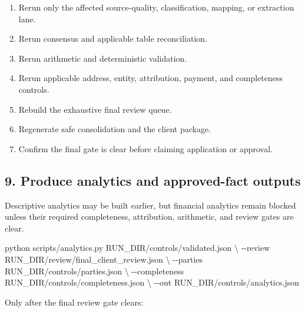\documentclass[
]{article}
\newenvironment{Shaded}{}{}
\newcommand{\AttributeTok}[1]{\textcolor[rgb]{0.49,0.56,0.16}{#1}}
\newcommand{\DataTypeTok}[1]{\textcolor[rgb]{0.56,0.13,0.00}{#1}}
\newcommand{\ExtensionTok}[1]{#1}
\newcommand{\NormalTok}[1]{#1}
\providecommand{\tightlist}{%
  \setlength{\itemsep}{0pt}\setlength{\parskip}{0pt}}
\begin{document}
\begin{enumerate}
\def\labelenumi{\arabic{enumi}.}
\tightlist
\item
  Rerun only the affected source-quality, classification, mapping, or
  extraction lane.
\item
  Rerun consensus and applicable table reconciliation.
\item
  Rerun arithmetic and deterministic validation.
\item
  Rerun applicable address, entity, attribution, payment, and
  completeness controls.
\item
  Rebuild the exhaustive final review queue.
\item
  Regenerate safe consolidation and the client package.
\item
  Confirm the final gate is clear before claiming application or
  approval.
\end{enumerate}

\subsection{9. Produce analytics and approved-fact
outputs}\label{produce-analytics-and-approved-fact-outputs}

Descriptive analytics may be built earlier, but financial analytics
remain blocked unless their required completeness, attribution,
arithmetic, and review gates are clear.

\begin{Shaded}
\begin{Highlighting}[]
\ExtensionTok{python}\NormalTok{ scripts/analytics.py RUN\_DIR/controls/validated.json }\DataTypeTok{\textbackslash{}}
  \AttributeTok{{-}{-}review}\NormalTok{ RUN\_DIR/review/final\_client\_review.json }\DataTypeTok{\textbackslash{}}
  \AttributeTok{{-}{-}parties}\NormalTok{ RUN\_DIR/controls/parties.json }\DataTypeTok{\textbackslash{}}
  \AttributeTok{{-}{-}completeness}\NormalTok{ RUN\_DIR/controls/completeness.json }\DataTypeTok{\textbackslash{}}
  \AttributeTok{{-}{-}out}\NormalTok{ RUN\_DIR/controls/analytics.json}
\end{Highlighting}
\end{Shaded}

Only after the final review gate clears:
\end{document}
